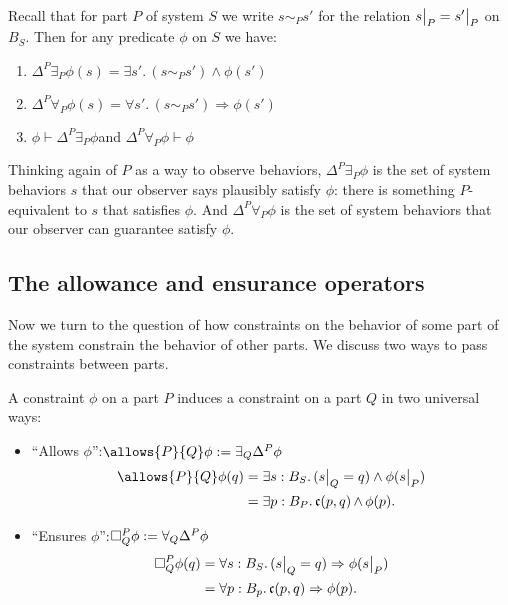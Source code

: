 \begin{lemma}\label{Thing:lem:Global.Modality.Props}
Recall that for part $P$ of system $S$ we write $s \sim_P s'$ for the relation $\rest{s}{P} = \rest{s'}{P}$ on $B_S$. Then for any predicate $\phi$ on $S$ we have:
\begin{enumerate}
    \item $\Delta^P \exists_P \phi(s) = \exists s'.\, (s\sim_P s') \wedge \phi(s')$
    \item $\Delta^P \forall_P \phi(s) = \forall s'.\, (s \sim_P s') \Rightarrow \phi(s')$
    \item $\phi \vdash \Delta^P \exists_P \phi$\quad and \quad $\Delta^P \forall_P \phi \vdash \phi$
\end{enumerate}
\end{lemma}
Thinking again of $P$ as a way to observe behaviors,
$\Delta^P \exists_P \phi$ is the set of system behaviors $s$ that our observer says plausibly satisfy $\phi$: there is something $P$-equivalent to $s$ that satisfies $\phi$. And $\Delta^P \forall_P \phi$ is the set of system behaviors that our observer can guarantee satisfy $\phi$.

\subsection{The allowance and ensurance operators}\label{subsec.compat_ensure}
Now we turn to the question of how constraints on the behavior of some part of the system constrain the behavior of other parts. We discuss two ways to pass constraints between parts.

     \begin{defn}
        A constraint $\phi$ on a part $P$ induces a constraint on a part $Q$ in two universal ways:
        \begin{itemize}
            \item ``Allows $\phi$'':\quad $\allows{P}{Q}\phi := \exists_Q \Delta^P\phi$
                \begin{align*}
               \allows{P}{Q} \phi(q) &=  \exists s : B_S.\, (\rest{s}{Q} = q) \wedge \phi(\rest{s}{P})\\
               &= \exists p : B_P.\, \mathfrak{c}(p, q) \meet \phi(p).
                \end{align*}
            \item ``Ensures $\phi$'':\quad $\ensure{P}{Q}\phi := \forall_Q  \Delta^P\phi$
                \begin{align*}
                \ensure{P}{Q} \phi(q) &= \forall s : B_S.\, (\rest{s}{Q} = q) \Rightarrow \phi(\rest{s}{P})\\
                &= \forall p : B_p.\, \mathfrak{c}(p, q) \Rightarrow \phi(p).
                \end{align*}
        \end{itemize} 
    \end{defn}
    
